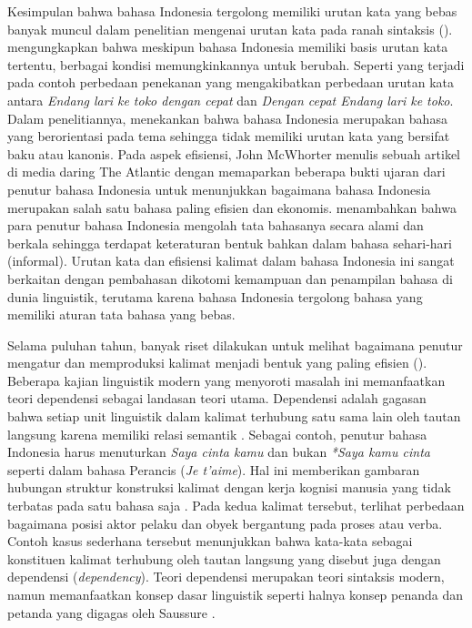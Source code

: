 Kesimpulan bahwa bahasa Indonesia tergolong memiliki urutan kata yang bebas banyak muncul dalam penelitian mengenai urutan kata pada ranah sintaksis (\citealp{stack2005word, postman2004processing}). \cite{sneddon2010indonesian} mengungkapkan bahwa meskipun bahasa Indonesia memiliki basis urutan kata tertentu, berbagai kondisi memungkinkannya untuk berubah. Seperti yang terjadi pada contoh perbedaan penekanan yang mengakibatkan perbedaan urutan kata antara \textit{Endang lari ke toko dengan cepat} dan \textit{Dengan cepat Endang lari ke toko}. Dalam penelitiannya, \cite{postman2004processing} menekankan bahwa bahasa Indonesia merupakan bahasa yang berorientasi pada tema sehingga tidak memiliki urutan kata yang bersifat baku atau kanonis. Pada aspek efisiensi, John McWhorter menulis sebuah artikel di media daring The Atlantic \citep{mcwhorter2016efficient} dengan memaparkan beberapa bukti ujaran dari penutur bahasa Indonesia untuk menunjukkan bagaimana bahasa Indonesia merupakan salah satu bahasa paling efisien dan ekonomis. \cite{mcwhorter2016efficient} menambahkan bahwa para penutur bahasa Indonesia mengolah tata bahasanya secara alami dan berkala sehingga terdapat keteraturan bentuk bahkan dalam bahasa sehari-hari (informal). Urutan kata dan efisiensi kalimat dalam bahasa Indonesia ini sangat berkaitan dengan pembahasan dikotomi kemampuan dan penampilan bahasa di dunia linguistik, terutama karena bahasa Indonesia tergolong bahasa yang memiliki aturan tata bahasa yang bebas.

Selama puluhan tahun, banyak riset dilakukan untuk melihat bagaimana penutur mengatur dan memproduksi kalimat menjadi bentuk yang paling efisien (\citealp{chomsky2005three, hawkins2004efficiency, zipf1935psycho, zipf1949human}). Beberapa kajian linguistik modern yang menyoroti masalah ini memanfaatkan teori dependensi sebagai landasan teori utama. Dependensi adalah gagasan bahwa setiap unit linguistik dalam kalimat terhubung satu sama lain oleh tautan langsung karena memiliki relasi semantik \citep{tesniere1959elements}. Sebagai contoh, penutur bahasa Indonesia harus menuturkan \textit{Saya cinta kamu} dan bukan \textit{*Saya kamu cinta} seperti dalam bahasa Perancis (\textit{Je t'aime}). Hal ini memberikan gambaran hubungan struktur konstruksi kalimat dengan kerja kognisi manusia yang tidak terbatas pada satu bahasa saja \citep{gibson2000dependency}. Pada kedua kalimat tersebut, terlihat perbedaan bagaimana posisi aktor pelaku dan obyek bergantung pada proses atau verba. Contoh kasus sederhana tersebut menunjukkan bahwa kata-kata sebagai konstituen kalimat terhubung oleh tautan langsung yang disebut juga dengan dependensi (\textit{dependency}). Teori dependensi merupakan teori sintaksis modern, namun memanfaatkan konsep dasar linguistik seperti halnya konsep penanda dan petanda yang digagas oleh Saussure \citep{key2017course}. 

